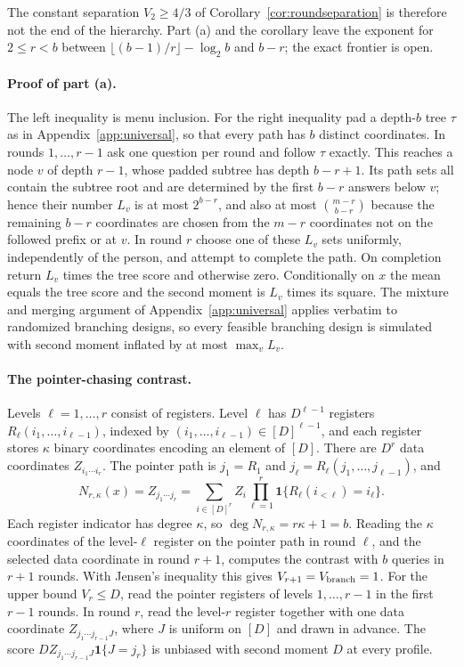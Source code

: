 The constant separation $V_2\ge4/3$ of Corollary~\ref{cor:roundseparation}
is therefore not the end of the hierarchy. Part (a) and the corollary leave
the exponent for $2\le r<b$ between $\lfloor(b-1)/r\rfloor-\log_2b$ and $b-r$;
the exact frontier is open.

\paragraph{Proof of part (a).}
The left inequality is menu inclusion. For the right inequality pad a
depth-$b$ tree $\tau$ as in Appendix~\ref{app:universal}, so that every path
has $b$ distinct coordinates. In rounds $1,\ldots,r-1$ ask one question per
round and follow $\tau$ exactly. This reaches a node $v$ of depth $r-1$,
whose padded subtree has depth $b-r+1$. Its path sets all contain the subtree
root and are determined by the first $b-r$ answers below $v$; hence their
number $L_v$ is at most $2^{b-r}$, and also at most $\binom{m-r}{b-r}$
because the remaining $b-r$ coordinates are chosen from the $m-r$
coordinates not on the followed prefix or at $v$. In round $r$ choose one of
these $L_v$ sets uniformly, independently of the person, and attempt to
complete the path. On completion return $L_v$ times the tree score and
otherwise zero. Conditionally on $x$ the mean equals the tree score and the
second moment is $L_v$ times its square. The mixture and merging argument of
Appendix~\ref{app:universal} applies verbatim to randomized branching
designs, so every feasible branching design is simulated with second
moment inflated by at most $\max_vL_v$.

\paragraph{The pointer-chasing contrast.}
Levels $\ell=1,\ldots,r$ consist of registers. Level $\ell$ has $D^{\ell-1}$
registers $R_\ell(i_1,\ldots,i_{\ell-1})$, indexed by
$(i_1,\ldots,i_{\ell-1})\in[D]^{\ell-1}$, and each register stores $\kappa$
binary coordinates encoding an element of $[D]$. There are $D^r$ data
coordinates $Z_{i_1\cdots i_r}$. The pointer path is $j_1=R_1$ and
$j_\ell=R_\ell(j_1,\ldots,j_{\ell-1})$, and
\[
 N_{r,\kappa}(x)=Z_{j_1\cdots j_r}
 =\sum_{i\in[D]^r}Z_i\prod_{\ell=1}^r\mathbf 1\{R_\ell(i_{<\ell})=i_\ell\}.
\]
Each register indicator has degree $\kappa$, so $\deg N_{r,\kappa}=r\kappa+1=b$.
Reading the $\kappa$ coordinates of the level-$\ell$ register on the pointer
path in round $\ell$, and the selected data coordinate in round $r+1$,
computes the contrast with $b$ queries in $r+1$ rounds. With Jensen's
inequality this gives $V_{r+1}=V_{\rm branch}=1$. For the upper bound
$V_r\le D$, read the pointer registers of levels $1,\ldots,r-1$ in the first
$r-1$ rounds. In round $r$, read the level-$r$ register together with one
data coordinate $Z_{j_1\cdots j_{r-1}J}$, where $J$ is uniform on $[D]$ and
drawn in advance. The score $DZ_{j_1\cdots j_{r-1}J}\mathbf 1\{J=j_r\}$ is
unbiased with second moment $D$ at every profile.

